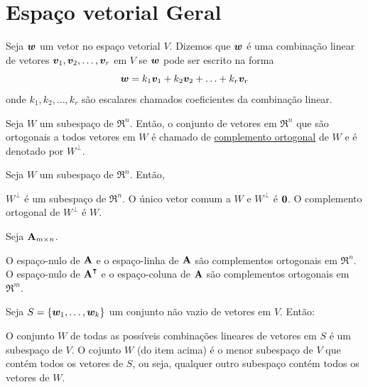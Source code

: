 \section{Espaço vetorial Geral}

\begin{definition}
	Seja $\bm{w}$ um vetor no espaço vetorial $V$. Dizemos que $\bm{w}$ é uma combinação linear de vetores $\bm{v}_1, \bm{v}_2, \ldots, \bm{v}_r$ em $V$ se $\bm{w}$ pode ser escrito na forma
	\begin{equation}
		\bm{w} = k_1 \bm{v}_1 + k_2 \bm{v}_2 + \ldots + k_r \bm{v}_r
	\end{equation}
	onde $k_1, k_2, \ldots, k_r$ são escalares chamados coeficientes da combinação linear.
\end{definition}

\begin{definition}
	Seja $W$ um subespaço de $\Re^n$. Então, o conjunto de vetores em $\Re^n$ que são ortogonais a todos vetores em $W$ é chamado de \underline{complemento ortogonal} de $W$ e é denotado por $W^\perp$.
\end{definition}

\begin{theorem} Seja $W$ um subespaço de $\Re^n$. Então,
	\begin{outline}[enumerate]
		\1 $W^\perp$ é um subespaço de $\Re^n$.
		\1 O único vetor comum a $W$ e $W^\perp$ é $\bm{0}$.
		\1 O complemento ortogonal de $W^\perp$  é $W$.
	\end{outline}
\end{theorem}

\begin{theorem} Seja $\mathbf{A}_{m \times n}$.
	\leavevmode
	\begin{outline}[enumerate]
		\1 O espaço-nulo de $\mathbf{A}$ e o espaço-linha de $\mathbf{A}$ são complementos ortogonais em $\Re^n$.
		\1 O espaço-nulo de $\m A\T$ e o espaço-coluna de $\mathbf{A}$ são complementos ortogonais em $\Re^m$.
	\end{outline}
\end{theorem}

\begin{theorem} Seja $S = \{ \bm{w}_1, \ldots, \bm{w}_k \}$ um conjunto não vazio de vetores em $V$. Então:
	\begin{outline}[enumerate]
		\1 O conjunto $W$ de todas as possíveis combinações lineares de vetores em $S$ é um subespaço de $V$.
		\1 O cojunto $W$ (do item acima) é o menor subespaço de $V$ que contém todos os vetores de $S$, ou seja, qualquer outro subespaço contém todos os vetores de $W$.
	\end{outline}
\end{theorem}

